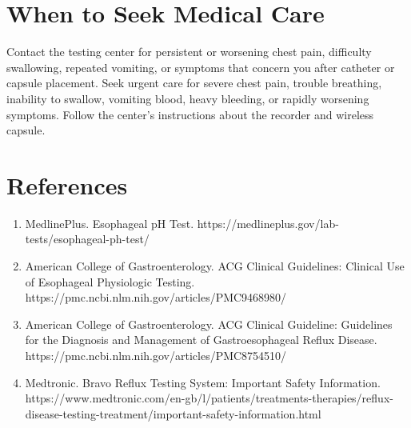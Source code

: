 \section*{When to Seek Medical Care}
Contact the testing center for persistent or worsening chest pain, difficulty swallowing, repeated vomiting, or symptoms that concern you after catheter or capsule placement. Seek urgent care for severe chest pain, trouble breathing, inability to swallow, vomiting blood, heavy bleeding, or rapidly worsening symptoms. Follow the center's instructions about the recorder and wireless capsule.

\section*{References}
\begin{enumerate}
  \item MedlinePlus. Esophageal pH Test. https://medlineplus.gov/lab-tests/esophageal-ph-test/
  \item American College of Gastroenterology. ACG Clinical Guidelines: Clinical Use of Esophageal Physiologic Testing. https://pmc.ncbi.nlm.nih.gov/articles/PMC9468980/
  \item American College of Gastroenterology. ACG Clinical Guideline: Guidelines for the Diagnosis and Management of Gastroesophageal Reflux Disease. https://pmc.ncbi.nlm.nih.gov/articles/PMC8754510/
  \item Medtronic. Bravo Reflux Testing System: Important Safety Information. https://www.medtronic.com/en-gb/l/patients/treatments-therapies/reflux-disease-testing-treatment/important-safety-information.html
\end{enumerate}

\clearpage
